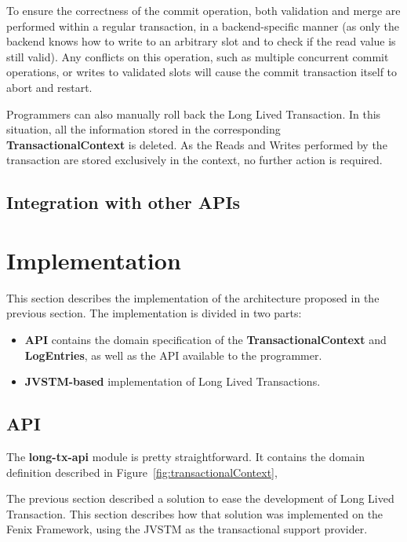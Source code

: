 To ensure the correctness of the commit operation, both validation and
merge are performed within a regular transaction, in a
backend-specific manner (as only the backend knows how to write to an
arbitrary slot and to check if the read value is still valid). Any
conflicts on this operation, such as multiple concurrent commit
operations, or writes to validated slots will cause the commit
transaction itself to abort and restart.

Programmers can also manually roll back the Long Lived Transaction. In
this situation, all the information stored in the corresponding {\bf
  TransactionalContext} is deleted. As the Reads and Writes performed
by the transaction are stored exclusively in the context, no further
action is required.

\subsection{Integration with other APIs}



\section{Implementation}
\label{sec:impl}

This section describes the implementation of the architecture proposed
in the previous section. The implementation is divided in two parts:

\begin{itemize}

\item {\bf API} contains the domain specification of the {\bf
    TransactionalContext} and {\bf LogEntries}, as well as the API
  available to the programmer.

\item {\bf JVSTM-based} implementation of Long Lived Transactions.

\end{itemize}

\subsection{API}

The {\bf long-tx-api} module is pretty straightforward. It contains
the domain definition described in Figure~\ref{fig:transactionalContext}, 

The previous section described a solution to ease the development of
Long Lived Transaction. This section describes how that solution was
implemented on the Fenix Framework, using the JVSTM as the
transactional support provider.

